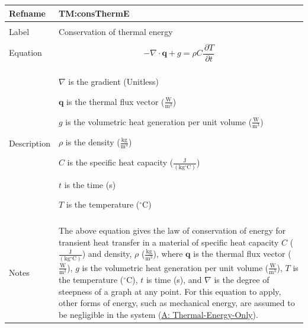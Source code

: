 \documentclass[12pt]{article}
\begin{document}
\vspace{\baselineskip}
\noindent
\begin{minipage}{\textwidth}
\begin{tabular}{>{\raggedright}p{}>{\raggedright\arraybackslash}p{}}
\toprule \textbf{Refname} & \textbf{TM:consThermE}
\label{TM:consThermE}
\\ \midrule \\
Label & Conservation of thermal energy
        
\\ \midrule \\
Equation & \begin{displaymath}
           -∇\cdot{}\mathbf{q}+g=ρ C \frac{\,\partial{}T}{\,\partial{}t}
           \end{displaymath}
\\ \midrule \\
Description & \begin{symbDescription}
              \item{$∇$ is the gradient (Unitless)}
              \item{$\mathbf{q}$ is the thermal flux vector ($\frac{\text{W}}{\text{m}^{2}}$)}
              \item{$g$ is the volumetric heat generation per unit volume ($\frac{\text{W}}{\text{m}^{3}}$)}
              \item{$ρ$ is the density ($\frac{\text{kg}}{\text{m}^{3}}$)}
              \item{$C$ is the specific heat capacity ($\frac{\text{J}}{(\text{kg}{}^{\circ}\text{C})}$)}
              \item{$t$ is the time (s)}
              \item{$T$ is the temperature (${}^{\circ}$C)}
              \end{symbDescription}
\\ \midrule \\
Notes & The above equation gives the law of conservation of energy for transient heat transfer in a material of specific heat capacity $C$ ($\frac{\text{J}}{(\text{kg}{}^{\circ}\text{C})}$) and density, $ρ$ ($\frac{\text{kg}}{\text{m}^{3}}$), where $\mathbf{q}$ is the thermal flux vector ($\frac{\text{W}}{\text{m}^{2}}$), $g$ is the volumetric heat generation per unit volume ($\frac{\text{W}}{\text{m}^{3}}$), $T$ is the temperature (${}^{\circ}$C), $t$ is time (s), and $∇$ is the degree of steepness of a graph at any point. For this equation to apply, other forms of energy, such as mechanical energy, are assumed to be negligible in the system (\hyperref[assumpTEO]{A: Thermal-Energy-Only}).
        

\end{tabular}
\end{minipage}
\end{document}
